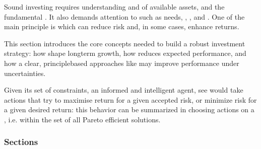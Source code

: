 \documentclass[letterpaper,10pt,english]{jupyterBook}
\begin{document}
\sphinxAtStartPar
Sound investing requires understanding {\hyperref[\detokenize{ch/principles/intro_nb:fin-edu-principles-return}]{}} and {\hyperref[\detokenize{ch/principles/intro_nb:fin-edu-principles-risk}]{}} of available assets, and the fundamental {\hyperref[\detokenize{ch/principles/intro_nb:fin-edu-principles-rr}]{}}. It also demands attention to  such as  needs, , , and . One of the main principle is {\hyperref[\detokenize{ch/principles/intro_nb:fin-edu-principles-diversification}]{}} \sphinxhyphen{} which can reduce risk and, in some cases, enhance returns.

\sphinxAtStartPar
This section introduces the core concepts needed to build a robust investment strategy: how {\hyperref[\detokenize{ch/principles/intro_nb:fin-edu-principles-time-compunding}]{}} shape long\sphinxhyphen{}term growth, how {\hyperref[\detokenize{ch/principles/intro_nb:fin-edu-principles-time-volatility-drag}]{}} reduces expected performance, and how a clear, principle\sphinxhyphen{}based approaches \sphinxhyphen{} like {\hyperref[\detokenize{ch/principles/intro_nb:fin-edu-principles-rebalancing}]{}} \sphinxhyphen{} may improve performance under uncertainties.

\sphinxAtStartPar
Given its set of constraints, an informed and intelligent agent, see {\hyperref[\detokenize{ch/principles/intro_nb:fin-edu-principles-asset-allocation}]{}} would take actions that try to maximise return for a given accepted risk, or minimize risk for a given desired return: this behavior can be summarized in choosing actions on a , i.e. within the set of all Pareto efficient solutions.
\subsubsection*{Sections}
\end{document}
